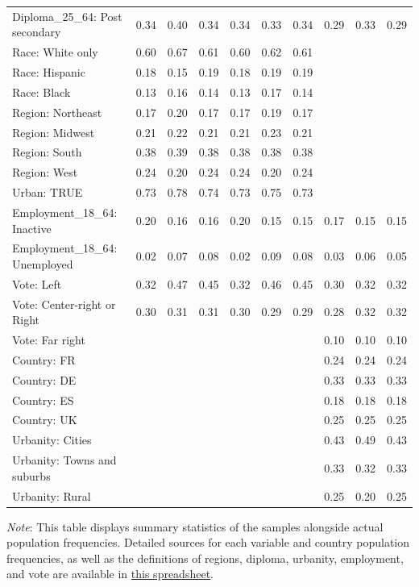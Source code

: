 \documentclass[12pt,english]{article}
\begin{document}
\begin{table}[h!]
{{\begin{tabular}[t]{llllllllll}
Diploma\_25\_64: Post secondary & 0.34 & 0.40 & 0.34 & 0.34 & 0.33 & 0.34 & 0.29 & 0.33 & 0.29\\
\addlinespace
Race: White only & 0.60 & 0.67 & 0.61 & 0.60 & 0.62 & 0.61 &  &  & \\
Race: Hispanic & 0.18 & 0.15 & 0.19 & 0.18 & 0.19 & 0.19 &  &  & \\
Race: Black & 0.13 & 0.16 & 0.14 & 0.13 & 0.17 & 0.14 &  &  & \\
\addlinespace
Region: Northeast & 0.17 & 0.20 & 0.17 & 0.17 & 0.19 & 0.17 &  &  & \\
Region: Midwest & 0.21 & 0.22 & 0.21 & 0.21 & 0.23 & 0.21 &  &  & \\
Region: South & 0.38 & 0.39 & 0.38 & 0.38 & 0.38 & 0.38 &  &  & \\
Region: West & 0.24 & 0.20 & 0.24 & 0.24 & 0.20 & 0.24 &  &  & \\
\addlinespace
Urban: TRUE & 0.73 & 0.78 & 0.74 & 0.73 & 0.75 & 0.73 &  &  & \\
\addlinespace
Employment\_18\_64: Inactive & 0.20 & 0.16 & 0.16 & 0.20 & 0.15 & 0.15 & 0.17 & 0.15 & 0.15\\
Employment\_18\_64: Unemployed & 0.02 & 0.07 & 0.08 & 0.02 & 0.09 & 0.08 & 0.03 & 0.06 & 0.05\\
\addlinespace
Vote: Left & 0.32 & 0.47 & 0.45 & 0.32 & 0.46 & 0.45 & 0.30 & 0.32 & 0.32\\
Vote: Center-right or Right & 0.30 & 0.31 & 0.31 & 0.30 & 0.29 & 0.29 & 0.28 & 0.32 & 0.32\\
Vote: Far right &  &  &  &  &  &  & 0.10 & 0.10 & 0.10\\
\addlinespace
Country: FR &  &  &  &  &  &  & 0.24 & 0.24 & 0.24\\
Country: DE &  &  &  &  &  &  & 0.33 & 0.33 & 0.33\\
Country: ES &  &  &  &  &  &  & 0.18 & 0.18 & 0.18\\
Country: UK &  &  &  &  &  &  & 0.25 & 0.25 & 0.25\\
\addlinespace
Urbanity: Cities &  &  &  &  &  &  & 0.43 & 0.49 & 0.43\\
Urbanity: Towns and suburbs &  &  &  &  &  &  & 0.33 & 0.32 & 0.33\\
Urbanity: Rural &  &  &  &  &  &  & 0.25 & 0.20 & 0.25\\
\bottomrule
\end{tabular}         }
    }
    {\footnotesize \textit{Note}: This table displays summary statistics of the samples alongside actual population frequencies. %
    Detailed sources for each variable and country population frequencies, as well as the definitions of regions, diploma, urbanity, employment, and vote are available in \href{https://github.com/bixiou/international_attitudes_toward_global_policies/raw/main/questionnaire/specificities.xlsx}{this spreadsheet}. %
    } %
\end{table}
\end{document}
